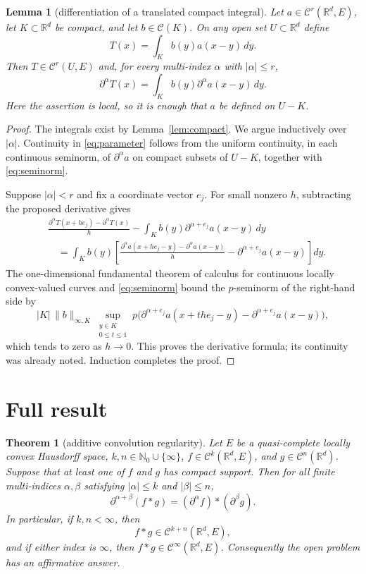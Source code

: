 \documentclass[11pt]{article}
\newtheorem{theorem}{Theorem}
\newtheorem{lemma}{Lemma}
\newcommand{\R}{\mathbb{R}}
\newcommand{\C}{\mathcal{C}}
\begin{document}
\Needspace{0.34\textheight}
\begin{lemma}[differentiation of a translated compact integral]
\label{lem:parameter}
Let $a\in\C^r(\R^d,E)$, let $K\subset\R^d$ be compact, and let
$b\in\C(K)$. On any open set $U\subset\R^d$ define
\[
 T(x)=\int_K b(y)a(x-y)\,dy.
\]
Then $T\in\C^r(U,E)$ and, for every multi-index $\alpha$ with
$|\alpha|\le r$,
\begin{equation}\label{eq:parameter}
 \partial^\alpha T(x)=\int_K b(y)\partial^\alpha a(x-y)\,dy.
\end{equation}
Here the assertion is local, so it is enough that $a$ be defined on
$U-K$.
\end{lemma}

\begin{proof}
The integrals exist by Lemma~\ref{lem:compact}. We argue inductively over
$|\alpha|$. Continuity in \eqref{eq:parameter} follows from the uniform
continuity, in each continuous seminorm, of $\partial^\alpha a$ on compact
subsets of $U-K$, together with \eqref{eq:seminorm}.

Suppose $|\alpha|<r$ and fix a coordinate vector $e_j$. For small nonzero
$h$, subtracting the proposed derivative gives
\begin{align*}
 &\frac{\partial^\alpha T(x+he_j)-\partial^\alpha T(x)}{h}
   -\int_K b(y)\partial^{\alpha+e_j}a(x-y)\,dy\\
 &\quad=\int_K b(y)\left[
 \frac{\partial^\alpha a(x+he_j-y)-\partial^\alpha a(x-y)}{h}
 -\partial^{\alpha+e_j}a(x-y)\right]dy.
\end{align*}
The one-dimensional fundamental theorem of calculus for continuous
locally convex-valued curves and \eqref{eq:seminorm} bound the $p$-seminorm
of the right-hand side by
\[
 |K|\,\|b\|_{\infty,K}
 \sup_{\substack{y\in K\\0\le t\le1}}
 p\bigl(\partial^{\alpha+e_j}a(x+the_j-y)
       -\partial^{\alpha+e_j}a(x-y)\bigr),
\]
which tends to zero as $h\to0$. This proves the derivative formula; its
continuity was already noted. Induction completes the proof.
\end{proof}

\section{Full result}

\begin{theorem}[additive convolution regularity]\label{thm:main}
Let $E$ be a quasi-complete locally convex Hausdorff space,
$k,n\in\mathbb N_0\cup\{\infty\}$,
$f\in\C^k(\R^d,E)$, and $g\in\C^n(\R^d)$. Suppose that at least one of
$f$ and $g$ has compact support. Then for all finite multi-indices
$\alpha,\beta$ satisfying $|\alpha|\le k$ and $|\beta|\le n$,
\begin{equation}\label{eq:mixed}
 \partial^{\alpha+\beta}(f*g)
   =(\partial^\alpha f)*(\partial^\beta g).
\end{equation}
In particular, if $k,n<\infty$, then
\[
 f*g\in\C^{k+n}(\R^d,E),
\]
and if either index is $\infty$, then $f*g\in\C^\infty(\R^d,E)$.
Consequently the open problem has an affirmative answer.
\end{theorem}
\end{document}
